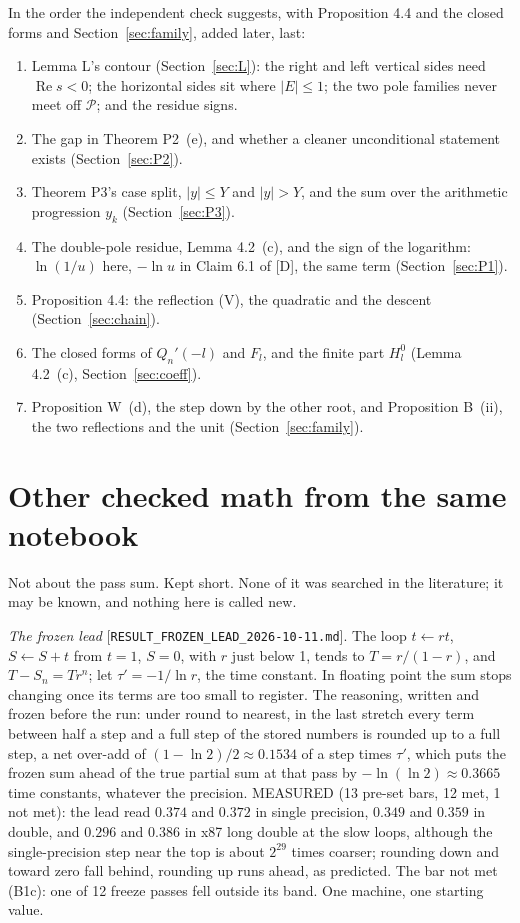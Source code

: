 \documentclass[11pt]{article}
\newcommand{\re}{\operatorname{Re}}
\newcommand{\rec}[1]{\nolinkurl{#1}}
\begin{document}
In the order the independent check suggests, with Proposition 4.4 and the closed forms and Section~\ref{sec:family}, added later, last:
\begin{enumerate}
\item Lemma L's contour (Section~\ref{sec:L}): the right and left vertical sides need $\re s<0$; the horizontal sides sit where $|E|\le1$; the two pole families never meet off $\mathcal{P}$; and the residue signs.
\item The gap in Theorem P2~(e), and whether a cleaner unconditional statement exists (Section~\ref{sec:P2}).
\item Theorem P3's case split, $|y|\le Y$ and $|y|>Y$, and the sum over the arithmetic progression $y_k$ (Section~\ref{sec:P3}).
\item The double-pole residue, Lemma 4.2~(c), and the sign of the logarithm: $\ln(1/u)$ here, $-\ln u$ in Claim 6.1 of [D], the same term (Section~\ref{sec:P1}).
\item Proposition 4.4: the reflection (V), the quadratic and the descent (Section~\ref{sec:chain}).
\item The closed forms of $Q_n'(-l)$ and $F_l$, and the finite part $H^0_l$ (Lemma 4.2~(c), Section~\ref{sec:coeff}).
\item Proposition W~(d), the step down by the other root, and Proposition B~(ii), the two reflections and the unit (Section~\ref{sec:family}).
\end{enumerate}

\appendix
\section{Other checked math from the same notebook}\label{sec:appendix}
\sloppy

Not about the pass sum. Kept short. None of it was searched in the literature; it may be known, and nothing here is called new.

\medskip
\noindent\emph{The frozen lead} [\rec{RESULT_FROZEN_LEAD_2026-10-11.md}]. The loop $t\leftarrow rt$, $S\leftarrow S+t$ from $t=1$, $S=0$, with $r$ just below 1, tends to $T=r/(1-r)$, and $T-S_n=Tr^n$; let $\tau'=-1/\ln r$, the time constant. In floating point the sum stops changing once its terms are too small to register. The reasoning, written and frozen before the run: under round to nearest, in the last stretch every term between half a step and a full step of the stored numbers is rounded up to a full step, a net over-add of $(1-\ln2)/2\approx0.1534$ of a step times $\tau'$, which puts the frozen sum ahead of the true partial sum at that pass by $-\ln(\ln2)\approx0.3665$ time constants, whatever the precision. MEASURED (13 pre-set bars, 12 met, 1 not met): the lead read $0.374$ and $0.372$ in single precision, $0.349$ and $0.359$ in double, and $0.296$ and $0.386$ in x87 long double at the slow loops, although the single-precision step near the top is about $2^{29}$ times coarser; rounding down and toward zero fall behind, rounding up runs ahead, as predicted. The bar not met (B1c): one of 12 freeze passes fell outside its band. One machine, one starting value.
\end{document}
